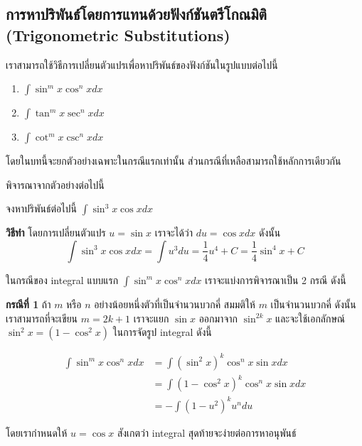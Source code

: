 \documentclass[
]{book}
\begin{document}
\subsection{การหาปริพันธ์โดยการแทนด้วยฟังก์ชันตรีโกณมิติ (Trigonometric
Substitutions)}\label{uxe01uxe32uxe23uxe2buxe32uxe1buxe23uxe1euxe19uxe18uxe42uxe14uxe22uxe01uxe32uxe23uxe41uxe17uxe19uxe14uxe27uxe22uxe1fuxe07uxe01uxe0auxe19uxe15uxe23uxe42uxe01uxe13uxe21uxe15-trigonometric-substitutions}

เราสามารถใช้วิธีการเปลี่ยนตัวแปรเพื่อหาปริพันธ์ของฟังก์ชันในรูปแบบต่อไปนี้

\begin{enumerate}
\def\labelenumi{\arabic{enumi}.}
\item
  \(\int \sin^m x \cos^n x dx\)
\item
  \(\int \tan^m x \sec^n x dx\)
\item
  \(\int \cot^m x \csc^n x dx\)
\end{enumerate}

โดยในบทนี้จะยกตัวอย่างเฉพาะในกรณีแรกเท่านั้น ส่วนกรณีที่เหลือสามารถใช้หลักการเดียวกัน

พิจารณาจากตัวอย่างต่อไปนี้

จงหาปริพันธ์ต่อไปนี้ \(\int \sin^3 x \cos x dx\)

\textbf{วิธีทำ} โดยการเปลี่ยนตัวแปร \(u = \sin x\) เราจะได้ว่า
\(du = \cos x dx\) ดังนั้น
\[\int \sin^3 x \cos x dx = \int u^3 du = \frac{1}{4}u^4 + C = \frac{1}{4} \sin ^4 x + C\]

ในกรณีของ integral แบบแรก \(\int \sin^m x \cos^n x dx\)
เราจะแบ่งการพิจารณาเป็น 2 กรณี ดังนี้

\textbf{กรณีที่ 1} ถ้า \(m\) หรือ \(n\) อย่างน้อยหนึ่งตัวที่เป็นจำนวนบวกคี่ สมมติให้
\(m\) เป็นจำนวนบวกคี่ ดังนั้นเราสามารถที่จะเขียน \(m = 2k +1\) เราจะแยก
\(\sin x\) ออกมาจาก \(\sin^{2k} x\) และจะใช้เอกลักษณ์
\(\sin^2 x = (1 - \cos^2 x)\) ในการจัดรูป integral ดังนี้

\begin{equation}
\begin{aligned}
        \int \sin^m x \cos^n x dx &= \int (\sin^{2}x)^k \cos^n x \sin x dx \\
                                    &= \int (1 - \cos^2 x)^k \cos^n x \sin x dx \\
    &= - \int (1 - u^2)^k u^n du 
\end{aligned}
\end{equation}

โดยเรากำหนดให้ \(u = \cos x\) สังเกตว่า integral สุดท้ายจะง่ายต่อการหาอนุพันธ์
\end{document}
